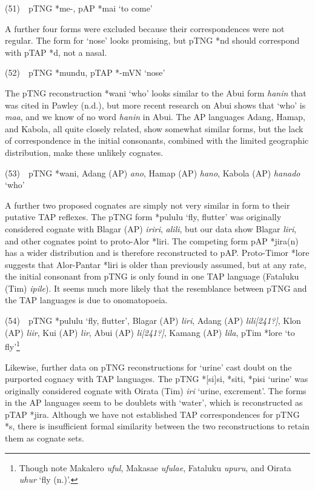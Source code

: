 (51)\ \ pTNG *me-, pAP *mai {\textquoteleft}to come{\textquoteright}

A further four forms were excluded because their correspondences were not regular. The form for {\textquoteleft}nose{\textquoteright} looks promising, but pTNG *nd should correspond with pTAP *d, not a nasal.

(52)\ \ pTNG *mundu, pTAP *-mVN {\textquoteleft}nose{\textquoteright} 

The pTNG reconstruction *wani {\textquoteleft}who{\textquoteright} looks similar to the Abui form \textit{hanin} that was cited in Pawley (n.d.), but more recent research on Abui shows that {\textquoteleft}who{\textquoteright} is \textit{maa}, and we know of  no word \textit{hanin} in Abui. The AP languages Adang, Hamap, and Kabola, all quite closely related, show somewhat similar forms, but the lack of correspondence in the initial consonants, combined with the limited geographic distribution, make these unlikely cognates. 

(53)\ \ pTNG *wani, Adang (AP) \textit{ano}, Hamap (AP) \textit{hano}, Kabola (AP) \textit{hanado} {\textquoteleft}who{\textquoteright}

A further two proposed cognates are simply not very similar in form to their putative TAP reflexes. The pTNG form *pululu {\textquoteleft}fly, flutter{\textquoteright} was originally considered cognate with Blagar (AP) \textit{iriri}, \textit{alili}, but our data show Blagar \textit{liri}, and other cognates point to proto-Alor *liri. The competing form pAP *jira(n) has a wider distribution and is therefore reconstructed to pAP. Proto-Timor *lore suggests that Alor-Pantar *liri is older than previously assumed, but at any rate, the initial consonant from pTNG is only found in one TAP language (Fataluku (Tim) \textit{ipile}). It seems much more likely that the resemblance between pTNG and the TAP languages is due to onomatopoeia. 

(54)\ \ pTNG *pululu {\textquoteleft}fly, flutter{\textquoteright}, Blagar (AP) \textit{liri}, Adang (AP) \textit{lili}\textit{[241?]}, Klon (AP) \textit{liir}, Kui (AP) \textit{lir}, Abui (AP) \textit{li}\textit{[241?]}, Kamang (AP) \textit{lila}, pTim *lore {\textquoteleft}to fly{\textquoteright}\footnote{ Though note Makalero \textit{uful}, Makasae \textit{ufulae}, Fataluku \textit{upuru}, and Oirata \textit{uhur} {\textquoteleft}fly (n.){\textquoteright}. }

Likewise, further data on pTNG reconstructions for {\textquoteleft}urine{\textquoteright} cast doubt on the purported cognacy with TAP languages. The pTNG *[si]si, *siti, *pisi {\textquoteleft}urine{\textquoteright} was originally considered cognate with Oirata (Tim) \textit{iri} {\textquoteleft}urine, excrement{\textquoteright}. The forms in the AP languages seem to be doublets with {\textquoteleft}water{\textquoteright}, which is reconstructed as pTAP *jira. Although we have not established TAP correspondences for pTNG *s, there is insufficient formal similarity between the two reconstructions to retain them as cognate sets. 


